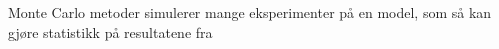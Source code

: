 \documentclass[presentation]{beamer}
\begin{document}
\begin{frame}{Monte Carlo metoder simulerer mange eksperimenter på en model, som så kan gjøre statistikk på resultatene fra}
\begin{figure}
\end{figure}
\end{frame}
\end{document}
